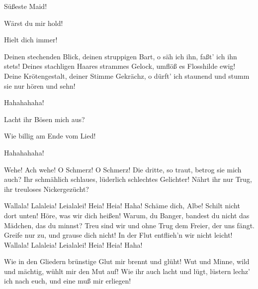 \begin{drama}
\Alberichspeaks
Süßeste Maid!
 

\Flosshildespeaks
Wärst du mir hold!
 

\Alberichspeaks
Hielt dich immer!
 

\Flosshildespeaks


Deinen stechenden Blick, deinen struppigen Bart,
o säh ich ihn, faßt' ich ihn stets!
Deines stachligen Haares strammes Gelock,
umflöß es Flosshilde ewig!
Deine Krötengestalt, deiner Stimme Gekrächz,
o dürft' ich staunend und stumm
sie nur hören und sehn!
 

Hahahahaha!
 

\Alberichspeaks


Lacht ihr Bösen mich aus?
 

\Flosshildespeaks


Wie billig am Ende vom Lied!
 




Hahahahaha!
 

\Alberichspeaks


Wehe! Ach wehe! O Schmerz! O Schmerz!
Die dritte, so traut, betrog sie mich auch?
Ihr schmählich schlaues, lüderlich schlechtes Gelichter!
Nährt ihr nur Trug, ihr treuloses Nickergezücht?
 

Wallala! Lalaleia! Leialalei!
Heia! Heia! Haha!
Schäme dich, Albe! Schilt nicht dort unten!
Höre, was wir dich heißen!
Warum, du Banger, bandest du nicht
das Mädchen, das du minnst?
Treu sind wir und ohne Trug
dem Freier, der uns fängt.
Greife nur zu, und grause dich nicht!
In der Flut entflieh'n wir nicht leicht!
Wallala! Lalaleia! Leialalei!
Heia! Heia! Haha!
 




\Alberichspeaks
Wie in den Gliedern brünstige Glut
mir brennt und glüht!
Wut und Minne, wild und mächtig,
wühlt mir den Mut auf!
Wie ihr auch lacht und lügt,
lüstern lechz' ich nach euch,
und eine muß mir erliegen!
 



\end{drama}
